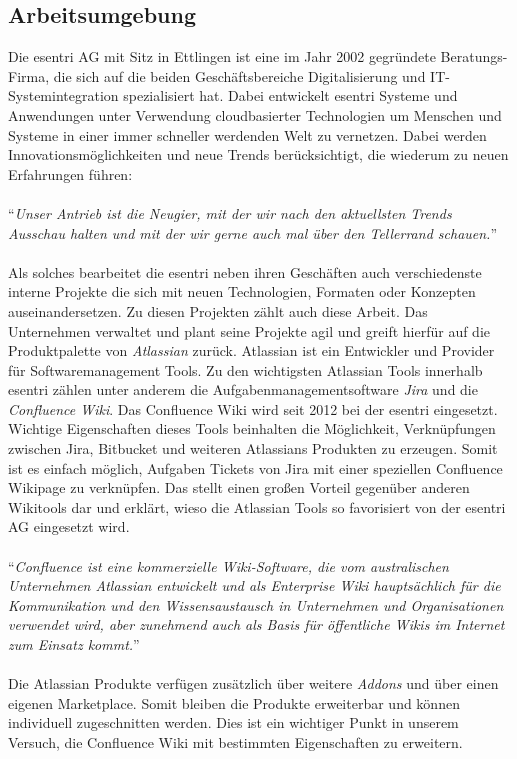 \documentclass[a4paper,12pt,twoside]{scrartcl}
\begin{document}
\subsection{Arbeitsumgebung}
Die esentri AG mit Sitz in Ettlingen ist eine im Jahr 2002 gegründete Beratungs-Firma, die sich auf die beiden Geschäftsbereiche Digitalisierung und IT-Systemintegration spezialisiert hat. Dabei entwickelt esentri Systeme und Anwendungen unter Verwendung cloudbasierter Technologien um Menschen und Systeme in einer immer schneller werdenden Welt zu vernetzen. Dabei werden Innovationsmöglichkeiten und neue Trends berücksichtigt, die wiederum zu neuen Erfahrungen führen:
\\\\
\enquote{\textit{Unser Antrieb ist die Neugier, mit der wir nach den aktuellsten Trends Ausschau halten und mit der wir gerne auch mal über den Tellerrand schauen.}} \footnotemark
{}
\\\\
Als solches bearbeitet die esentri neben ihren Geschäften auch verschiedenste interne Projekte die sich mit neuen Technologien, Formaten oder Konzepten auseinandersetzen. Zu diesen Projekten zählt auch diese Arbeit. Das Unternehmen verwaltet und plant seine Projekte agil und greift hierfür auf die Produktpalette von \textit{Atlassian} zurück. Atlassian ist ein Entwickler und Provider für Softwaremanagement Tools. Zu den wichtigsten Atlassian Tools innerhalb esentri zählen unter anderem die Aufgabenmanagementsoftware \textit{Jira} und die \textit{Confluence Wiki}. Das Confluence Wiki wird seit 2012 bei der esentri eingesetzt. Wichtige Eigenschaften dieses Tools beinhalten die Möglichkeit, Verknüpfungen zwischen Jira, Bitbucket und weiteren Atlassians Produkten zu erzeugen. Somit ist es einfach möglich, Aufgaben Tickets von Jira mit einer speziellen Confluence Wikipage zu verknüpfen. Das stellt einen großen Vorteil gegenüber anderen Wikitools dar und erklärt, wieso die Atlassian Tools so favorisiert von der esentri AG eingesetzt wird.
\\\\
\enquote{\textit{Confluence ist eine kommerzielle Wiki-Software, die vom australischen Unternehmen Atlassian entwickelt und als Enterprise Wiki hauptsächlich für die Kommunikation und den Wissensaustausch in Unternehmen und Organisationen verwendet wird, aber zunehmend auch als Basis für öffentliche Wikis im Internet zum Einsatz kommt.}} \footnotemark
{}
\\\\
Die Atlassian Produkte verfügen zusätzlich über weitere \textit{Addons} und über einen eigenen Marketplace. Somit bleiben die Produkte erweiterbar und können individuell zugeschnitten werden. Dies ist ein wichtiger Punkt in unserem Versuch, die Confluence Wiki mit bestimmten Eigenschaften zu erweitern.
\end{document}
